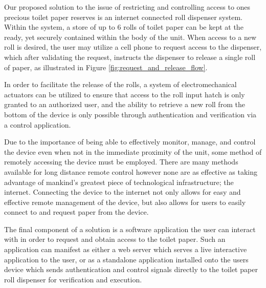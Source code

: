
\par Our proposed solution to the issue of restricting and controlling access to ones precious toilet paper reserves is an internet connected roll dispenser system.  Within the system, a store of up to 6 rolls of toilet paper can be kept at the ready, yet securely contained within the body of the unit.  When access to a new roll is desired, the user may utilize a cell phone to request access to the dispenser, which after validating the request, instructs the dispenser to release a single roll of paper, as illustrated in Figure \ref{fig:request_and_release_flow}.\\


\par In order to facilitate the release of the rolls, a system of electromechanical actuators can be utilized to ensure that access to the roll input hatch is only granted to an authorized user, and the ability to retrieve a new roll from the bottom of the device is only possible through authentication and verification via a control application.\\

\par Due to the importance of being able to effectively monitor, manage, and control the device even when not in the immediate proximity of the unit, some method of remotely accessing the device must be employed.  There are many methods available for long distance remote control however none are as effective as taking advantage of mankind's greatest piece of technological infrastructure; the internet.  Connecting the device to the internet not only allows for easy and effective remote management of the device, but also allows for users to easily connect to and request paper from the device.\\

\par The final component of a solution is a software application the user can interact with in order to request and obtain access to the toilet paper.  Such an application can manifest as either a web server which serves a live interactive application to the user, or as a standalone application installed onto the users device which sends authentication and control signals directly to the toilet paper roll dispenser for verification and execution.